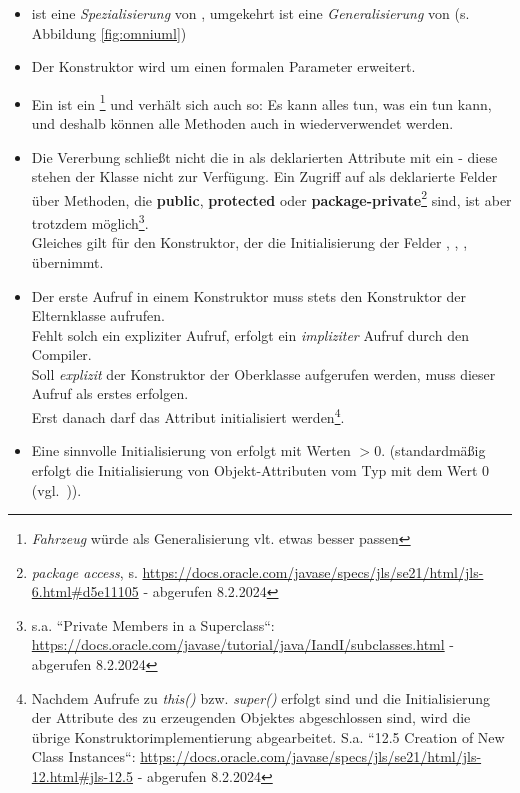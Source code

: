 \begin{itemize}
    \item {} ist eine \textit{Spezialisierung} von , umgekehrt ist
     eine \textit{Generalisierung} von  (s. Abbildung \ref{fig:omniuml})
    \item Der Konstruktor wird um einen formalen Parameter  erweitert.
    \item Ein  ist ein \footnote{\textit{Fahrzeug} würde als Generalisierung vlt. etwas besser passen} und verhält sich auch so: Es kann alles tun, was ein  tun kann, und deshalb können alle Methoden auch in  wiederverwendet werden.
    \item Die Vererbung schließt nicht die in  als  deklarierten Attribute mit ein - diese stehen der Klasse  nicht zur Verfügung.
    Ein Zugriff auf als  deklarierte Felder über Methoden, die \textbf{public}, \textbf{protected} oder \textbf{package-private}\footnote{\textit{package access}, s. \url{https://docs.oracle.com/javase/specs/jls/se21/html/jls-6.html#d5e11105} - abgerufen 8.2.2024} sind, ist aber trotzdem möglich\footnote{s.a. ``Private Members in a Superclass``: \url{https://docs.oracle.com/javase/tutorial/java/IandI/subclasses.html} - abgerufen 8.2.2024}.\\
    Gleiches gilt für den Konstruktor, der die Initialisierung der Felder , , ,  übernimmt.
    \item Der erste Aufruf in einem Konstruktor muss stets den Konstruktor der Elternklasse aufrufen.\\
    Fehlt solch ein expliziter Aufruf, erfolgt ein \textit{impliziter} Aufruf durch den Compiler.\\
    Soll \textit{explizit} der Konstruktor der Oberklasse aufgerufen werden, muss dieser Aufruf als erstes erfolgen.\\
    Erst danach darf das Attribut  initialisiert werden\footnote{
    Nachdem Aufrufe zu \textit{this()} bzw. \textit{super()} erfolgt sind und die Initialisierung der Attribute des zu erzeugenden Objektes abgeschlossen sind, wird die übrige Konstruktorimplementierung abgearbeitet. S.a. ``12.5 Creation of New Class Instances``: \url{https://docs.oracle.com/javase/specs/jls/se21/html/jls-12.html#jls-12.5} - abgerufen 8.2.2024
    }.
    \item Eine sinnvolle Initialisierung von  erfolgt mit Werten $> 0$.
    (standardmäßig erfolgt die Initialisierung von Objekt-Attributen vom Typ  mit dem Wert $0$ (vgl.~\cite[127]{Ull23})).
\end{itemize}


